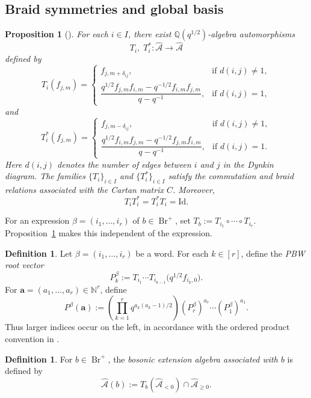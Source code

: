 \documentclass[12pt, reqno]{amsart}
\theoremstyle{plain}
\newtheorem{proposition}[theorem]{Proposition}
\theoremstyle{definition}
\newtheorem{definition}[theorem]{Definition}
\numberwithin{equation}{section}
\newcommand{\Br}{{\operatorname{Br}}}
\begin{document}
\subsection{Braid symmetries and global basis}

\begin{proposition}[{\cite[Theorem~3.1]{kashiwara2024braid}}]\label{pro:braidsym}
For each \(i\in I\), there exist \(\mathbb Q(q^{1/2})\)-algebra automorphisms
\[
T_i,\; T_i^*:\widehat{\mathcal A}\to \widehat{\mathcal A}
\]
defined by
\[
T_i(f_{j,m}) =
\begin{cases}
f_{j,m+\delta_{ij}}, & \text{if } d(i,j)\neq 1,\\[4pt]
\dfrac{q^{1/2} f_{j,m} f_{i,m}-q^{-1/2} f_{i,m} f_{j,m}}{q-q^{-1}},
& \text{if } d(i,j)=1,
\end{cases}
\]
and
\[
T_i^{*}(f_{j,m}) =
\begin{cases}
f_{j,m-\delta_{ij}}, & \text{if } d(i,j)\neq 1,\\[4pt]
\dfrac{q^{1/2} f_{i,m} f_{j,m}-q^{-1/2} f_{j,m} f_{i,m}}{q-q^{-1}},
& \text{if } d(i,j)=1.
\end{cases}
\]
Here \(d(i,j)\) denotes the number of edges between \(i\) and \(j\) in the Dynkin
diagram. The families \(\{T_i\}_{i\in I}\) and \(\{T_i^*\}_{i\in I}\) satisfy
the commutation and braid relations associated with the Cartan matrix \(C\).
Moreover,
\[
T_iT_i^*=T_i^*T_i=\mathrm{Id}.
\]
\end{proposition}

For an expression $\beta=(i_1,\ldots,i_r)$ of $b\in\Br^+$, set
$T_b:=T_{i_1}\circ\cdots\circ T_{i_r}$.
Proposition~\ref{pro:braidsym} makes this independent of the expression.

\begin{definition}
Let \(\beta=(i_1,\dots,i_r)\) be a word. For each \(k\in[r]\), define the
\emph{PBW root vector}
\[
P_k^\beta
:=
T_{i_1}\cdots T_{i_{k-1}}\bigl(q^{1/2}f_{i_k,0}\bigr).
\]
For \(\mathbf a=(a_1,\ldots,a_r)\in\mathbb N^r\), define
\[
P^\beta(\mathbf a)
:=
\left(\prod_{k=1}^{r}q^{a_k(a_k-1)/2}\right)
(P_r^\beta)^{a_r}\cdots(P_1^\beta)^{a_1}.
\]
Thus larger indices occur on the left, in accordance with the ordered
product convention in \cite{kashiwara2024braid}.
\end{definition}

\begin{definition}
For \(b\in\Br^+\), the \emph{bosonic extension algebra associated with \(b\)}
is defined by
\[
\widehat{\mathcal A}(b)
:=
T_b(\widehat{\mathcal A}_{<0})\cap \widehat{\mathcal A}_{\geq 0}.
\]
\end{definition}
\end{document}
